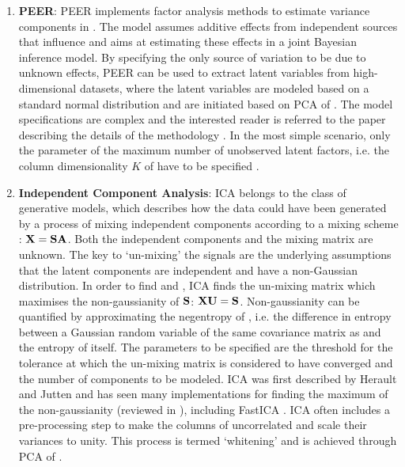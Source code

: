 \begin{enumerate}
\item\textbf{PEER}: PEER implements factor analysis methods to estimate variance components in . The model assumes additive effects from independent sources that influence  and aims at estimating these effects in a joint Bayesian inference model.  By specifying the only source of variation to be due to unknown effects, PEER can be used to extract latent variables from high-dimensional datasets, where the latent variables are modeled based on a standard normal distribution and are initiated based on PCA of . The model specifications are complex and the interested reader is referred to the paper describing the details of the methodology \citep{Stegle2010}. In the most simple scenario, only the parameter of the maximum number of unobserved latent factors, i.e. the column dimensionality \(K\) of  have to be specified \citep{Stegle2012}. 

\item\textbf{Independent Component Analysis}:  ICA belongs to the class of generative models, which describes how the data  could have been generated by a process of mixing independent components  according to a mixing scheme : \(\boldsymbol{\mathbf{X}} = \boldsymbol{\mathbf{SA}}\). Both the independent components and the mixing matrix are unknown. The key to `un-mixing' the signals are the underlying assumptions that the latent components are independent and have a non-Gaussian distribution. In order to find  and , ICA finds the un-mixing matrix  which maximises the non-gaussianity of \(\boldsymbol{\mathbf{S}}\): \(\boldsymbol{\mathbf{XU}}=\boldsymbol{\mathbf{S}}\). Non-gaussianity can be quantified by approximating the negentropy of  , i.e. the difference in entropy between a Gaussian random variable of the same covariance matrix as  and the entropy of  itself. The parameters to be specified are the threshold for the tolerance at which the un-mixing matrix is considered to have converged and the number of components to be modeled.  ICA was first described by Herault and Jutten \citeyear{Herault1983} and has seen many implementations for finding the maximum of the non-gaussianity (reviewed in \citep{Common1994}), including FastICA \citep{Hyvarinen2000}. ICA often includes a pre-processing step to make the columns of  uncorrelated and scale their variances to unity. This process is termed  `whitening' and is achieved through PCA of . 


\end{enumerate}
